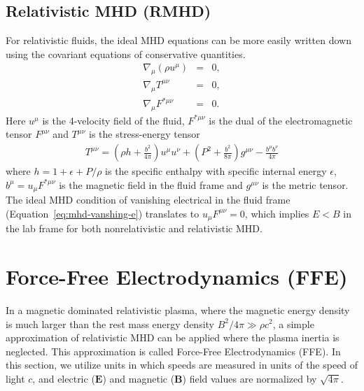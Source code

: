 \subsection{Relativistic MHD (RMHD)}
For relativistic fluids, the ideal MHD equations can be more easily written down using the covariant equations of conservative quantities.
\begin{eqnarray}\label{eq:rmhd-covariant}
	\nabla_\mu (\rho u^\mu) &=& 0, \\
	\nabla_\mu T^{\mu\nu} &=& 0,\\
	\nabla_\mu F^{*\mu\nu}&=& 0.
\end{eqnarray}
Here $u^\mu$ is the 4-velocity field of the fluid, $F^{*\mu\nu}$ is the dual of the electromagnetic tensor $F^{\mu\nu}$ and $T^{\mu\nu}$ is the stress-energy tensor
\begin{eqnarray}
	T^{\mu\nu} = \left(\rho h + \frac{b^2}{4\pi}\right)u^\mu u^\nu + \left(P^2 + \frac{b^2}{8\pi}\right) g^{\mu\nu} - \frac{b^\mu b^\nu}{4\pi}
\end{eqnarray}
where $h= 1+\epsilon +P/\rho$ is the specific enthalpy with specific internal energy $\epsilon$, $b^\mu=u_\mu F^{*\mu\nu}$ is the magnetic field in the fluid frame and $g^{\mu\nu}$ is the metric tensor.
The ideal MHD condition of vanishing electrical in the fluid frame (Equation~\ref{eq:mhd-vanshing-e}) translates to $u_\mu F^{\mu\nu}=0$, which implies $E<B$ in the lab frame for both nonrelativistic and relativistic MHD.

\section{Force-Free Electrodynamics (FFE)}
\label{sec:ffe}

In a magnetic dominated relativistic plasma, where the magnetic energy density is much larger than the rest mass energy density $B^2/4\pi\gg \rho c^2$, a simple approximation of relativistic MHD can be applied where the plasma inertia is neglected.
This approximation is called Force-Free Electrodynamics (FFE).
In this section, we utilize units in which speeds are measured in units of the speed of light $c$, and electric ($\boldsymbol{E}$) and magnetic ($\boldsymbol{B}$) field values are normalized by $\sqrt{4 \pi}$. 

